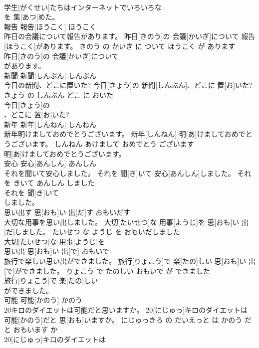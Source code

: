 \documentclass[8pt]{extreport}
\begin{document}
\begin{CJK}{UTF8}{min}
\\	学生[がくせい]たちはインターネットでいろいろな
\\	を 集[あつ]めた。			
\\	報告	報告[ほうこく]	ほうこく	
\\	昨日の会議について報告があります。	昨日[きのう]の 会議[かいぎ]について 報告[ほうこく]があります。	きのう の かいぎ に ついて ほうこく が あります	
\\	昨日[きのう]の 会議[かいぎ]について
\\	があります。			
\\	新聞	新聞[しんぶん]	しんぶん	
\\	今日の新聞、どこに置いた?	今日[きょう]の 新聞[しんぶん]、どこに 置[お]いた?	きょう の しんぶん どこ に おいた	
\\	今日[きょう]の
\\	、どこに 置[お]いた?			
\\	新年	新年[しんねん]	しんねん	
\\	新年明けましておめでとうございます。	新年[しんねん] 明[あ]けましておめでとうございます。	しんねん あけまして おめでとう ございます	
\\	明[あ]けましておめでとうございます。			
\\	安心	安心[あんしん]	あんしん	
\\	それを聞いて安心しました。	それを 聞[き]いて 安心[あんしん]しました。	それ を きいて あんしん しました	
\\	それを 聞[き]いて
\\	しました。			
\\	思い出す	思[おも]い 出[だ]す	おもいだす	
\\	大切な用事を思い出しました。	大切[たいせつ]な 用事[ようじ]を 思[おも]い 出[だ]しました。	たいせつ な ようじ を おもいだしました	
\\	大切[たいせつ]な 用事[ようじ]を
\\	思い出	思[おも]い 出[で]	おもいで	
\\	旅行で楽しい思い出ができました。	旅行[りょこう]で 楽[たの]しい 思[おも]い 出[で]ができました。	りょこう で たのしい おもいで が できました	
\\	旅行[りょこう]で 楽[たの]しい
\\	ができました。			
\\	可能	可能[かのう]	かのう	
\\	20キロのダイエットは可能だと思いますか。	20[にじゅっ]キロのダイエットは 可能[かのう]だと 思[おも]いますか。	にじゅっきろ の だいえっと は かのう だ と おもいます か	
\\	20[にじゅっ]キロのダイエットは

\end{CJK}
\end{document}
